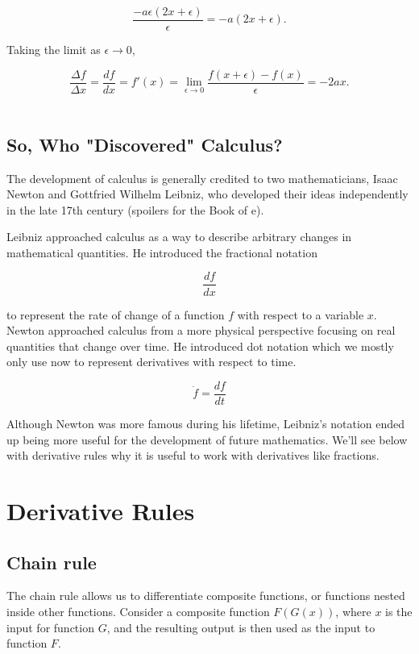 \documentclass[12pt]{article}
\begin{document}
\[
\frac{-a\epsilon(2x+\epsilon)}{\epsilon}
=
-a(2x+\epsilon).
\]

Taking the limit as $\epsilon \to 0$,

\[
\frac{\Delta f}{\Delta x} = \frac{d f}{d x } = f'(x)
=
\lim_{\epsilon\to 0}
\frac{f(x+\epsilon)-f(x)}{\epsilon}
=
-2ax.
\]\\

\subsection{So, Who "Discovered" Calculus?}

The development of calculus is generally credited to two mathematicians, Isaac Newton and Gottfried Wilhelm Leibniz,
who developed their ideas independently in the late 17th century (spoilers for the Book of e).

Leibniz approached calculus as a way to describe
arbitrary changes in mathematical quantities.
He introduced the fractional notation

\[
\frac{d f}{d x}
\]

to represent the rate of change of a function $f$
with respect to a variable $x$.\\

Newton approached calculus from a more physical perspective focusing on real quantities that change over time. He introduced dot notation which we mostly only use now
to represent derivatives with respect to time.

\[
\dot{f} = \frac{d f}{d t}
\]

Although Newton was more famous during his lifetime,
Leibniz's notation ended up being more
useful for the development of future mathematics. We'll see below with derivative rules why it is useful to work with derivatives like fractions.

\section{Derivative Rules}

\subsection{Chain rule} 
The chain rule allows us to differentiate
composite functions, or functions nested inside
other functions. Consider a composite function $F(G(x))$, where $x$ is the input for function $G$, and the resulting output is then used as the input to function $F$.
\end{document}
